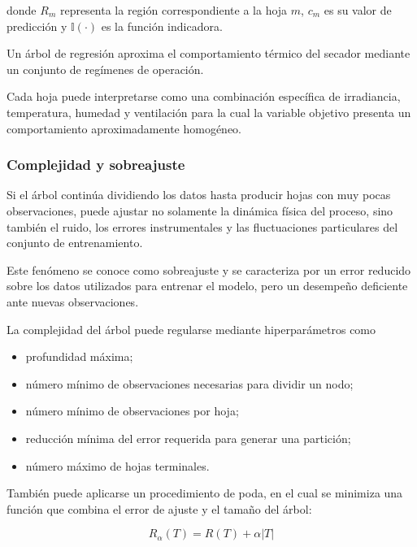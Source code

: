 donde $R_m$ representa la región correspondiente a la hoja $m$, $c_m$ es su valor de predicción y $\mathbb{I}(\cdot)$ es la función indicadora.

\begin{tcolorbox}[
title=Interpretación física,
colback=blue!4,
colframe=blue!65!black
]
Un árbol de regresión aproxima el comportamiento térmico del secador mediante un conjunto de regímenes de operación.

Cada hoja puede interpretarse como una combinación específica de irradiancia, temperatura, humedad y ventilación para la cual la variable objetivo presenta un comportamiento aproximadamente homogéneo.
\end{tcolorbox}

\subsubsection{Complejidad y sobreajuste}

Si el árbol continúa dividiendo los datos hasta producir hojas con muy pocas observaciones, puede ajustar no solamente la dinámica física del proceso, sino también el ruido, los errores instrumentales y las fluctuaciones particulares del conjunto de entrenamiento.

Este fenómeno se conoce como sobreajuste y se caracteriza por un error reducido sobre los datos utilizados para entrenar el modelo, pero un desempeño deficiente ante nuevas observaciones.

La complejidad del árbol puede regularse mediante hiperparámetros como

\begin{itemize}
    \item profundidad máxima;
    \item número mínimo de observaciones necesarias para dividir un nodo;
    \item número mínimo de observaciones por hoja;
    \item reducción mínima del error requerida para generar una partición;
    \item número máximo de hojas terminales.
\end{itemize}

También puede aplicarse un procedimiento de poda, en el cual se minimiza una función que combina el error de ajuste y el tamaño del árbol:

\begin{equation}
\boxed{
R_{\alpha}(T)
=
R(T)
+
\alpha |T|
}
\label{eq:poda_arbol}
\end{equation}

